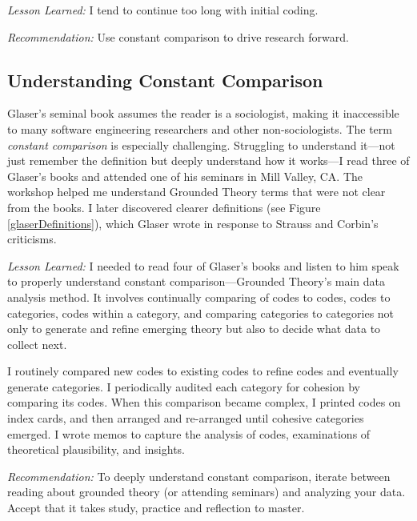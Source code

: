 \textit{Lesson Learned:} I tend to continue too long with initial coding. 

\textit{Recommendation:} Use constant comparison to drive research forward.
\subsection{Understanding Constant Comparison}
Glaser's seminal book assumes the reader is a sociologist, making it inaccessible to many software engineering researchers and other non-sociologists. The term \textit{constant comparison} is especially challenging. Struggling to understand it---not just remember the definition but deeply understand how it works---I read three of Glaser's books \cite{GlaserDiscovery, GlaserIssues, GlaserTheoreticalSensitivity} and attended one of his seminars in Mill Valley, CA. The workshop helped me understand Grounded Theory terms that were not clear from the books. I later discovered clearer definitions \cite{GlaserBasics} (see Figure \ref{glaserDefinitions}), which Glaser wrote in response to Strauss and Corbin's \cite{Strauss1988Basics} criticisms.

\textit{Lesson Learned:} I needed to read four of Glaser's books and listen to him speak to properly understand constant comparison---Grounded Theory's main data analysis method. It involves continually comparing of codes to codes, codes to categories, codes within a category, and comparing categories to categories not only to generate and refine emerging theory but also to decide what data to collect next.

I routinely compared new codes to existing codes to refine codes and eventually generate categories. I periodically audited each category for cohesion by comparing its codes. When this comparison became complex, I printed codes on index cards, and then arranged and re-arranged until cohesive categories emerged. I wrote memos to capture the analysis of codes, examinations of theoretical plausibility, and insights.

\textit{Recommendation:} To deeply understand constant comparison, iterate between reading about grounded theory (or attending seminars) and analyzing your data. Accept that it takes study, practice and reflection to master. 


